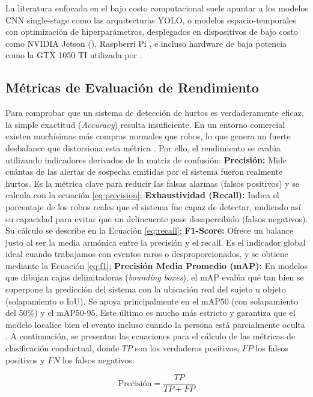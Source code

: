   La literatura enfocada en el bajo costo computacional suele apuntar a los modelos CNN 
  single-stage como las arquitecturas YOLO, o modelos espacio-temporales con optimización
  de hiperparámetros, desplegados en dispositivos de bajo costo como NVIDIA Jetson
  (\cite{hameed_real_2025}), Raspberri Pi \cite{m_deep_2023}, e incluso hardware de baja
  potencia como la GTX 1050 TI utilizada por \cite{ansari_optimized_2023}.

\subsection{Métricas de Evaluación de Rendimiento}

Para comprobar que un sistema de detección de hurtos es verdaderamente eficaz, la simple exactitud (\textit{Accuracy}) resulta insuficiente. En un entorno comercial existen muchísimas más compras normales que robos, lo que genera un fuerte desbalance que distorsiona esta métrica \cite{rashvand_exploring_2025}. Por ello, el rendimiento se evalúa utilizando indicadores derivados de la matriz de confusión: \textbf{Precisión:} Mide cuántas de las alertas de sospecha emitidas por el sistema fueron realmente hurtos. Es la métrica clave para reducir las falsas alarmas (falsos positivos) y se calcula con la ecuación \ref{eq:precision}; \textbf{Exhaustividad (Recall):} Indica el porcentaje de los robos reales que el sistema fue capaz de detectar, midiendo así su capacidad para evitar que un delincuente pase desapercibido (falsos negativos). Su cálculo se describe en la Ecuación \ref{eq:recall}; \textbf{F1-Score:} Ofrece un balance justo al ser la media armónica entre la precisión y el recall. Es el indicador global ideal cuando trabajamos con eventos raros o desproporcionados, y se obtiene mediante la Ecuación \ref{eq:f1}; \textbf{Precisión Media Promedio (mAP):} En modelos que dibujan cajas delimitadoras (\textit{bounding boxes}), el mAP evalúa qué tan bien se superpone la predicción del sistema con la ubicación real del sujeto u objeto (solapamiento o IoU). Se apoya principalmente en el mAP50 (con solapamiento del 50\%) y el mAP50-95. Este último es mucho más estricto y garantiza que el modelo localice bien el evento incluso cuando la persona está parcialmente oculta \cite{aguero_intelligent_2025}. A continuación, se presentan las ecuaciones para el cálculo de las métricas de clasificación conductual, donde $TP$ son los verdaderos positivos, $FP$ los falsos positivos y $FN$ los falsos negativos:

\begin{equation} \label{eq:precision}
    \text{Precisión} = \frac{TP}{TP + FP}
\end{equation}

